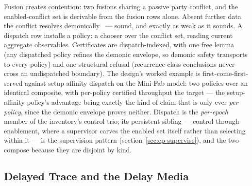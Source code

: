 Fusion creates contention: two fusions sharing a passive party
conflict, and the enabled-conflict set is derivable from the fusion
rows alone. Absent further data the conflict resolves
demonically~\cite{baier18hbmc} --- sound, and exactly as weak as it
sounds. A dispatch row installs a
policy: a chooser over the conflict set, reading current aggregate
observables. Certificates are dispatch-indexed, with one free lemma
(any dispatched policy refines the demonic envelope, so demonic
safety transports to every policy) and one structural refusal
(recurrence-class conclusions never cross an undispatched boundary).
The design's worked example is first-come-first-served against
setup-affinity dispatch on the Mini-Fab model: two policies over an
identical composite, with per-policy certified throughput the target
--- the setup-affinity policy's advantage being exactly the kind of
claim that is only ever \emph{per-policy}, since the demonic envelope
proves neither. Dispatch is the \emph{per-epoch} member of the
inventory's control trio; its persistent sibling --- control through
enablement, where a supervisor carves the enabled set itself rather
than selecting within it --- is the supervision pattern
(section~\ref{sec:cp-supervise}), and the two compose because they
are disjoint by kind.

\subsection{Delayed Trace and the Delay Media}
\label{sec:cp-dtrace}

